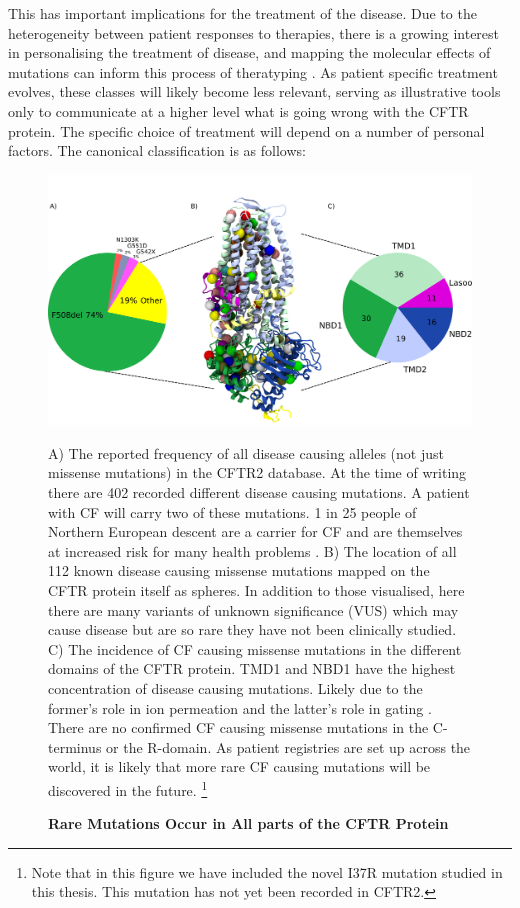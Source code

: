 This has important implications for the treatment of the disease. Due to the heterogeneity between patient responses to therapies, there is a growing interest in personalising the treatment of disease, and mapping the molecular effects of mutations can inform this process of theratyping \cite{crawford2018,sette2021}. As patient specific treatment evolves, these classes will likely become less relevant, serving as illustrative tools only to communicate at a higher level what is going wrong with the CFTR protein. The specific choice of treatment will depend on a number of personal factors. The canonical classification is as follows:

\begin{figure}
	\begin{center}
	\includegraphics[width=\textwidth]{figures/alleles_pie_chart.pdf}
	\end{center}
	\captionsetup{singlelinecheck = false, justification=raggedright}
	\caption[Rare Mutations Occur Across the CFTR Protein] {\textbf{Rare Mutations Occur in All parts of the CFTR Protein}}{A) The reported frequency of all disease causing alleles (not just missense mutations) in the CFTR2 database. At the time of writing there are 402 recorded different disease causing mutations. A patient with CF will carry two of these mutations. 1 in 25 people of Northern European descent are a carrier for CF and are themselves at increased risk for many health problems \cite{ioannou2014, miller2020}. B) The location of all 112 known disease causing missense mutations mapped on the CFTR protein itself as spheres. In addition to those visualised, here there are many variants of unknown significance (VUS) which may cause disease but are so rare they have not been clinically studied. C) The incidence of CF causing missense mutations in the different domains of the CFTR protein. TMD1 and NBD1 have the highest concentration of disease causing mutations. Likely due to the former's role in ion permeation and the latter's role in gating \cite{cftr2}}. There are no confirmed CF causing missense mutations in the C-terminus or the R-domain. As patient registries are set up across the world, it is likely that more rare CF causing mutations will be discovered in the future. \footnote{Note that in this figure we have included the novel I37R mutation studied in this thesis. This mutation has not yet been recorded in CFTR2.} 
	\label{CFTR_mutations_pie_chart}
\end{figure}


